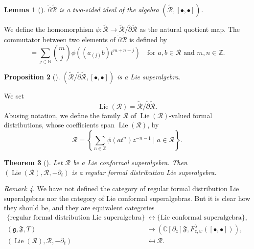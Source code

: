 \documentclass[a4paper, 12pt, reqno]{amsart}
\newtheorem{theorem}{Theorem}[section]
\newtheorem{lemma}[theorem]{Lemma}
\newtheorem{proposition}[theorem]{Proposition}
\theoremstyle{remark}
\newtheorem{remark}[theorem]{Remark}
\DeclareMathOperator{\Lie}{Lie}
\begin{document}
\begin{lemma}[{\cite[Proposition 2.6.1]{nozaradan_introduction_2008}}]
  \label{lmm:1}
  $\widetilde{\partial}\widetilde{\mathcal{R}}$ is a two-sided ideal of the algebra $(\widetilde{\mathcal{R}}, [\bullet, \bullet])$.
\end{lemma}

We define the homomorphism $\phi: \widetilde{\mathcal{R}} \to \widetilde{\mathcal{R}}/\widetilde{\partial}\widetilde{\mathcal{R}}$ as the natural quotient map.
The commutator between two elements of $\widetilde{\partial}\widetilde{\mathcal{R}}$ is defined by
\begin{equation*}
  [\phi(at^m), \phi(bt^n)] = \sum_{j \in \mathbb{N}}\binom{m}{j}\phi((a_{(j)}b)t^{m + n - j}) \quad \text{for $a, b \in \mathcal{R}$ and $m, n \in \mathbb{Z}$}.
\end{equation*}

\begin{proposition}[{\cite[Proposition 2.6.3]{nozaradan_introduction_2008}}]
  \label{prp:5}
  $(\widetilde{\mathcal{R}}/\widetilde{\partial}\widetilde{\mathcal{R}}, [\bullet, \bullet])$ is a Lie superalgebra.
\end{proposition}

We set
\begin{equation*}
  \Lie(\mathcal{R}) = \widetilde{\mathcal{R}}/\widetilde{\partial}\widetilde{\mathcal{R}}.
\end{equation*}
Abusing notation, we define the family $\mathcal{R}$ of $\Lie(\mathcal{R})$-valued formal distributions, whose coefficients span $\Lie(\mathcal{R})$, by
\begin{equation*}
  \mathcal{R} = \left\{\sum_{n \in \mathbb{Z}}\phi(at^n)z^{-n - 1} \mid a \in \mathcal{R}\right\}.
\end{equation*}

\begin{theorem}[{\cite[Proposition 2.6.4]{nozaradan_introduction_2008}}]
  \label{thr:9}
  Let $\mathcal{R}$ be a Lie conformal superalgebra.
  Then $(\Lie(\mathcal{R}), \mathcal{R}, -\partial_t)$ is a regular formal distribution Lie superalgebra.
\end{theorem}

\begin{remark}
  \label{rmk:7}
  We have not defined the category of regular formal distribution Lie superalgebras nor the category of Lie conformal superalgebras.
  But it is clear how they should be, and they are equivalent categories
  \begin{align*}
    \{\text{regular formal distribution Lie superalgebra}\} &\leftrightarrow \{\text{Lie conformal superalgebra}\}, \\
    (\mathfrak{g}, \mathfrak{F}, T) &\mapsto (\mathbb{C}[\partial_z]\mathfrak{F}, F^{\lambda}_{z, w}([\bullet, \bullet])), \\
    (\Lie(\mathcal{R}), \mathcal{R}, -\partial_t) &\mapsfrom \mathcal{R}.
  \end{align*}
\end{remark}
\end{document}
